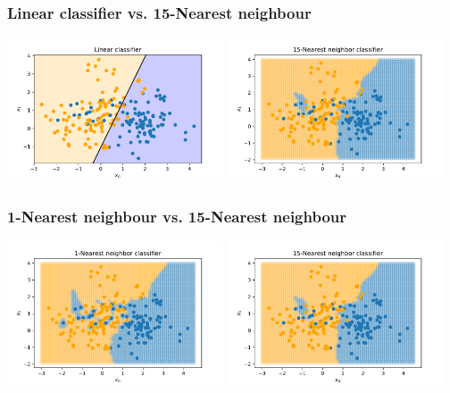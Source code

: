 \documentclass[notes]{beamer}          %
\begin{document}
\begin{frame}
\frametitle{Linear classifier vs. 15-Nearest neighbour}
    \begin{center}
        \includegraphics[width=0.48\textwidth]{../figures/week_1/linear_model.pdf}
        \hfill
        \includegraphics[width=0.48\textwidth]{../figures/week_1/15-nn.pdf}
    \end{center}
\end{frame}


\begin{frame}
\frametitle{1-Nearest neighbour vs. 15-Nearest neighbour}
    \begin{center}
        \includegraphics[width=0.48\textwidth]{../figures/week_1/1-nn.pdf}
        \hfill
        \includegraphics[width=0.48\textwidth]{../figures/week_1/15-nn.pdf}
    \end{center}
\end{frame}
\end{document}
